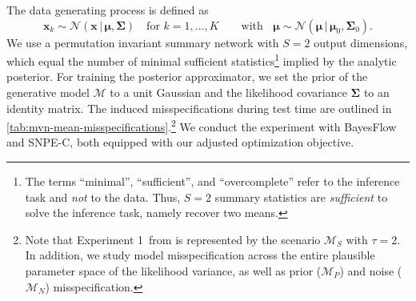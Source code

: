 \documentclass[twoside,11pt]{article}
\newcommand{\numberGaussianMeans}{1}
\newcommand{\x}{\boldsymbol{x}}
\newcommand{\mub}{\boldsymbol{\mu}}
\newcommand{\Sigmab}{\boldsymbol{\Sigma}}
\newcommand{\etab}{\boldsymbol{\eta}}
\newcommand{\0}{\boldsymbol{0}}
\newcommand{\given}{\,|\,}
\newcommand{\M}{\mathcal{M}}
\renewcommand{\cite}[1]{\citep{#1}}
\begin{document}
The data generating process is defined as
\begin{equation}
    \x_k \sim \mathcal{N}(\x\given\mub, \Sigmab) \quad\text{for } k = 1,...,K\qquad \text{with }\;\;
    \mub \sim \mathcal{N}(\mub\given\mub_0, \Sigmab_0).
\end{equation}
We use a permutation invariant summary network \cite{invariant} with $S=2$ output dimensions, which equal the number of minimal sufficient statistics\footnote{The terms ``minimal'', ``sufficient'', and ``overcomplete'' refer to the inference task and \emph{not} to the data. Thus, $S=2$ summary statistics are \emph{sufficient} to solve the inference task, namely recover two means.} implied by the analytic posterior.
For training the posterior approximator, we set the prior of the generative model $\M$ to a unit Gaussian and the likelihood covariance $\Sigmab$ to an identity matrix.
The induced misspecifications during test time are outlined in \autoref{tab:mvn-mean-misspecifications}.\footnote{Note that Experiment \numberGaussianMeans~from \citet{ward_robust_2022} is represented by the scenario $\mathcal{M}_S$ with $\tau=2$.
In addition, we study model misspecification across the entire plausible parameter space of the likelihood variance, as well as prior ($\M_P$) and noise ($\M_N$) misspecification.
}
We conduct the experiment with BayesFlow and SNPE-C, both equipped with our adjusted optimization objective.%
\end{document}
